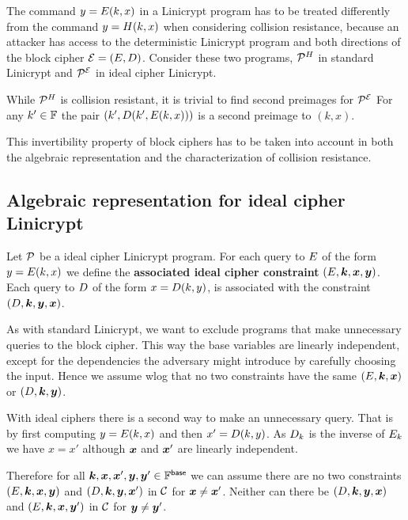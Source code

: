 The command $y = \E(k, x)$ in a Linicrypt program has to be treated differently from the command $y = \H(k, x)$ when considering collision resistance,
because an attacker has access to the deterministic Linicrypt program and both directions of the block cipher $\mathcal{E} = (\E, \D)$.
Consider these two programs, $\PH$ in standard Linicrypt and $\PE$ in ideal cipher Linicrypt.

\begin{pchstack}[center,space=2cm]
\end{pchstack}
While $\PH$ is collision resistant, it is trivial to find second preimages for $\PE$
For any $k' \in \F$ the pair $(k', \D(k', \E(k, x)))$ is a second preimage to $(k,x)$.

This invertibility property of block ciphers has to be taken into account
in both the algebraic representation and the characterization of collision resistance.

\subsection{Algebraic representation for ideal cipher Linicrypt}

Let $\P$ be a ideal cipher Linicrypt program. For each query to $\E$ of the form $y =
\E(k,x)$ we define the \textbf{associated ideal cipher constraint} $(\E, \v k, \v x, \v y)$.
Each query to $\D$ of the form $x = \D(k, y)$, is
associated with the constraint $(\D, \v k, \v y, \v x)$.

As with standard Linicrypt,
we want to exclude programs that make unnecessary queries to the block cipher.
This way the base variables are linearly independent,
except for the dependencies the adversary might introduce by carefully choosing the input.
Hence we assume wlog that no two constraints have the same $(\E, \v k, \v x)$ or $(\D, \v k, \v y)$.

With ideal ciphers there is a second way to make an unnecessary query.
That is by first computing $y = \E(k,x)$ and then $x' = \D(k, y)$.
As $\D_k$ is the inverse of $\E_k$ we have $x = x'$ although $\v x$ and $\v x'$ are linearly independent.


Therefore for all $\v k, \v x, \v x', \v y, \v y' \in \Base$ we can assume there are no two constraints
$(\E, \v k,\v x, \v y)$ and $(\D, \v k, \v y, \v x')$ in $\C$ for $\v x \neq \v x'$.
Neither can there be $(\D, \v k,\v y, \v x)$ and $(\E, \v k, \v x, \v y')$ in $\C$ for $\v y \neq \v y'$.

